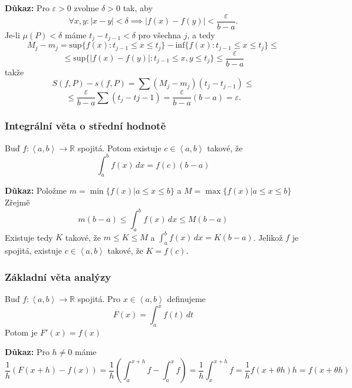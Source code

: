 \documentclass[../main.tex]{subfiles}
\begin{document}
\noindent
\textbf{Důkaz:} Pro $\varepsilon > 0 $ zvolme $\delta > 0$ tak, aby 
\[\forall x,y : |x-y| < \delta \implies |f(x) - f(y)| < \frac{\varepsilon}{b-a}.\]
Je-li $\mu(P) < \delta$ máme $t_j-t_{j-1} < \delta$ pro všechna $j$, a tedy
\[M_j - m_j = \text{sup}\{f(x) : t_{j-1} \leq x \leq t_j\} - \text{inf}\{f(x) : t_{j-1} \leq x \leq t_j\} \leq\]
\[\leq \text{sup}\{|f(x) - f(y)| : t_{j-1} \leq x,y \leq t_j\} \leq \frac{\varepsilon}{b-a}\]
takže
\[S(f,P) - s(f,P) = \sum (M_j - m_j)(t_j-t_{j-1})\leq\]
\[\leq \frac{\varepsilon}{b-a}\sum (t_j-t{j-1}) = \frac{\varepsilon}{b-a}(b-a) = \varepsilon.\]

\subsubsection{Integrální věta o střední hodnotě}
\hspace{1.2mm}
Buď $f: \left< a,b \right> \to \mathbb{R}$ spojitá. Potom existuje $c \in \left< a,b \right>$
takové, že
\[ \int_{a}^{b} f(x) \,dx = f(c)(b-a)\]

\vspace{5mm}
\noindent
\textbf{Důkaz:} Položme $m = \min \{ f(x)|a \leq x \leq b \}$ a $M = \max \{ f(x)|a \leq x \leq b \} $
Zřejmě
\[ m(b-a) \leq \int_{a}^{b} f(x) \,dx \leq M(b-a) \]
Existuje tedy $K$ takové, že $m \leq K \leq M$ a $\int_{a}^{b} f(x) \,dx = K(b-a)$.
Jelikož $f$ je spojitá, existuje $c \in \left< a,b \right>$ takové, že $K = f(c)$.

\subsubsection{Základní věta analýzy}
\hspace{1.2mm}
Buď $f: \left< a,b \right> \to \mathbb{R}$ spojitá. Pro $x \in \left< a,b \right>$ definujeme
\[ F(x) = \int_{a}^{x} f(t) \,dt \]
Potom je $F'(x) = f(x)$

\vspace{5mm}
\noindent
\textbf{Důkaz:}
Pro $h\neq 0$ máme
\[ \frac{1}{h}(F(x+h) - f(x)) =\frac{1}{h}\left( \int_{a}^{x+h} f - \int_{a}^{x} f \right) =
\frac{1}{h} \int_{x}^{x+h} f = \frac{1}{h}f(x + \theta h)h = f(x + \theta h) \]

\end{document}
